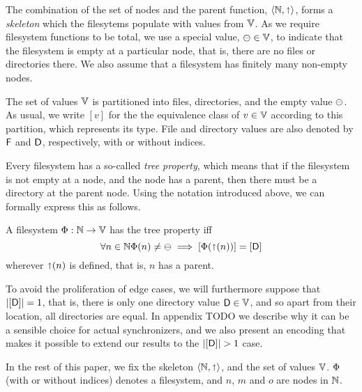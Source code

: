 The combination of the set of nodes and the parent function,
$\langle \mathbb{N}, \mathord{\shortuparrow} \rangle$, forms a \emph{skeleton}
which the filesytems populate with values from $\mathbb{V}$.
As we require filesystem functions to be total,
we use a special value, $\ominus\in\mathbb{V}$, to indicate that the filesystem
is empty at a particular node, that is, there are no files or directories there.
We also assume that a filesystem has finitely many non-empty nodes.

\begin{mydef}
The set of values $\mathbb{V}$ is partitioned into files, directories, and the empty value $\ominus$.
As usual, we write $[v]$ for the the equivalence class of $v\in\mathbb{V}$ according to this partition,
which represents its type.
File and directory values are also denoted by $\mathsf{F}$ and $\mathsf{D}$, respectively,
with or without indices.
\end{mydef}


Every filesystem has a so-called \emph{tree property}, which means that
if the filesystem is not empty at a node, and the node has a parent,
then there must be a directory at the parent node.
Using the notation introduced above, we can formally express this as follows.
\begin{mydef}
A filesystem $\Phi:\mathbb{N} \rightarrow \mathbb{V}$ has the tree property iff
\[ \forall n\in\mathbb{N}
\Phi(n) \neq \ominus \; \Longrightarrow \; [\Phi(\mathord{\shortuparrow}({n}))] = [\mathsf{D}] \]
wherever $\mathord{\shortuparrow}(n)$ is defined, that is, $n$ has a parent.
\end{mydef}


To avoid the proliferation of edge cases, we will furthermore suppose that
$|[\mathsf{D}]|=1$, that is, there is only one directory value $\mathsf{D}\in\mathbb{V}$, and so
apart from their location, all directories are equal.
In appendix TODO we describe why it can be a sensible choice
for actual synchronizers, and we also present an encoding that makes it possible
to extend our results to the $|\setd|>1$ case.



\myskip
In the rest of this paper,
we fix the skeleton $\langle\mathbb{N},\mathord{\shortuparrow}\rangle$,
and the set of values $\mathbb{V}$.
$\Phi$ (with or without indices) denotes a filesystem,
and $n$, $m$ and $o$ are nodes in $\mathbb{N}$.
